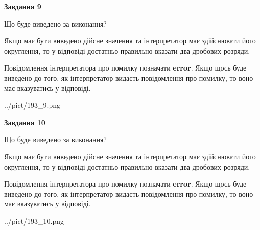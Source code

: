 \documentclass[12pt, ukrainian]{article}
\begin{document}
{\begin {Large}
{\begin {center}\textbf{Завдання 9}\end {center}}\par
Що буде виведено за виконання? \par

Якщо має бути виведено дійсне значення та інтерпретатор має здійснювати його округлення, 
то у відповіді достатньо правильно вказати два дробових розряди.

Повідомлення інтерпретатора про помилку позначати \textbf{error}.
Якщо щось буде виведено до того, як інтерпретатор видасть повідомлення про помилку, 
то воно має вказуватись у відповіді. \par

\begin{center}
	{../pict/193_9.png}
\end{center}
\newpage

{\begin {center}\textbf{Завдання 10}\end {center}}\par
Що буде виведено за виконання? \par

Якщо має бути виведено дійсне значення та інтерпретатор має здійснювати його округлення, 
то у відповіді достатньо правильно вказати два дробових розряди.

Повідомлення інтерпретатора про помилку позначати \textbf{error}.
Якщо щось буде виведено до того, як інтерпретатор видасть повідомлення про помилку, 
то воно має вказуватись у відповіді. \par

\begin{center}
	{../pict/193_10.png}
\end{center}
\newpage

\end {Large}}
\end{document}
